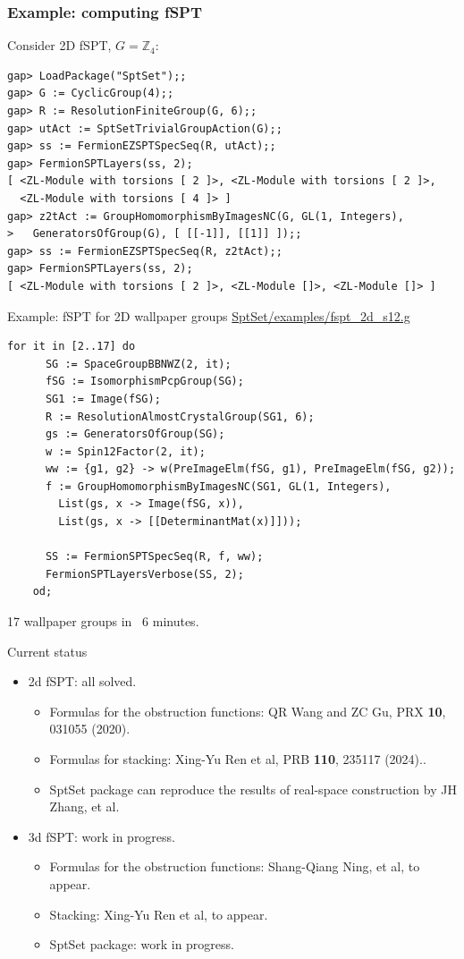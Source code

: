 \documentclass[xcolor=table, aspectratio=169,ignorenonframetext]{beamer}
\begin{document}
\begin{frame}[fragile]
	\frametitle{Example: computing fSPT}
	Consider 2D fSPT, $G=\mathbb Z_4$:
\begin{lstlisting}[basicstyle=\footnotesize]
gap> LoadPackage("SptSet");;
gap> G := CyclicGroup(4);;
gap> R := ResolutionFiniteGroup(G, 6);;
gap> utAct := SptSetTrivialGroupAction(G);;
gap> ss := FermionEZSPTSpecSeq(R, utAct);;
gap> FermionSPTLayers(ss, 2);
[ <ZL-Module with torsions [ 2 ]>, <ZL-Module with torsions [ 2 ]>,
  <ZL-Module with torsions [ 4 ]> ]
gap> z2tAct := GroupHomomorphismByImagesNC(G, GL(1, Integers),
>   GeneratorsOfGroup(G), [ [[-1]], [[1]] ]);;
gap> ss := FermionEZSPTSpecSeq(R, z2tAct);;
gap> FermionSPTLayers(ss, 2);
[ <ZL-Module with torsions [ 2 ]>, <ZL-Module []>, <ZL-Module []> ]
\end{lstlisting}

\end{frame}

\begin{frame}[fragile]{Example: fSPT for 2D wallpaper groups}
	\url{SptSet/examples/fspt_2d_s12.g}
	\begin{lstlisting}[basicstyle=\footnotesize]
    for it in [2..17] do
      SG := SpaceGroupBBNWZ(2, it);
      fSG := IsomorphismPcpGroup(SG);
      SG1 := Image(fSG);
      R := ResolutionAlmostCrystalGroup(SG1, 6);
      gs := GeneratorsOfGroup(SG);
      w := Spin12Factor(2, it);
      ww := {g1, g2} -> w(PreImageElm(fSG, g1), PreImageElm(fSG, g2));
      f := GroupHomomorphismByImagesNC(SG1, GL(1, Integers),
        List(gs, x -> Image(fSG, x)),
        List(gs, x -> [[DeterminantMat(x)]]));

      SS := FermionSPTSpecSeq(R, f, ww);
      FermionSPTLayersVerbose(SS, 2);
    od;
  \end{lstlisting}
  17 wallpaper groups in ~6 minutes.
\end{frame}

\begin{frame}{Current status}
  \begin{itemize}
    \item 2d fSPT: all solved.
    \begin{itemize}
      \item Formulas for the obstruction functions: QR Wang and ZC Gu, PRX \textbf{10}, 031055 (2020).
      \item Formulas for stacking: Xing-Yu Ren et al, PRB \textbf{110}, 235117 (2024)..
      \item SptSet package can reproduce the results of real-space construction by JH Zhang, et al.
    \end{itemize}
    \item 3d fSPT: work in progress.
    \begin{itemize}
      \item Formulas for the obstruction functions: Shang-Qiang Ning, et al, to appear.
      \item Stacking: Xing-Yu Ren et al, to appear.
      \item SptSet package: work in progress.
    \end{itemize}
  \end{itemize}
\end{frame}
\end{document}
